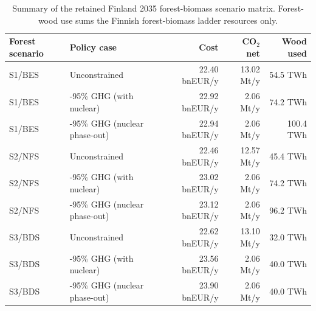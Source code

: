 \documentclass{article}
\begin{document}
\begin{table}[H]
  \centering
  \small
  \renewcommand{\arraystretch}{1.08}
  \begin{tabularx}{\linewidth}{llrrr}
    \toprule
    \textbf{Forest scenario} & \textbf{Policy case} & \textbf{Cost} & \textbf{CO$_2$ net} & \textbf{Wood used} \\
    \midrule
    S1/BES & Unconstrained & 22.40 bnEUR/y & 13.02 Mt/y & 54.5 TWh \\
    S1/BES & -95\% GHG (with nuclear) & 22.92 bnEUR/y & 2.06 Mt/y & 74.2 TWh \\
    S1/BES & -95\% GHG (nuclear phase-out) & 22.94 bnEUR/y & 2.06 Mt/y & 100.4 TWh \\
    S2/NFS & Unconstrained & 22.46 bnEUR/y & 12.57 Mt/y & 45.4 TWh \\
    S2/NFS & -95\% GHG (with nuclear) & 23.02 bnEUR/y & 2.06 Mt/y & 74.2 TWh \\
    S2/NFS & -95\% GHG (nuclear phase-out) & 23.12 bnEUR/y & 2.06 Mt/y & 96.2 TWh \\
    S3/BDS & Unconstrained & 22.62 bnEUR/y & 13.10 Mt/y & 32.0 TWh \\
    S3/BDS & -95\% GHG (with nuclear) & 23.56 bnEUR/y & 2.06 Mt/y & 40.0 TWh \\
    S3/BDS & -95\% GHG (nuclear phase-out) & 23.90 bnEUR/y & 2.06 Mt/y & 40.0 TWh \\
    \bottomrule
  \end{tabularx}
  \caption{Summary of the retained Finland 2035 forest-biomass scenario matrix. Forest-wood use sums the Finnish forest-biomass ladder resources only.}
  \label{tab:fi_2035_matrix}
\end{table}
\end{document}
